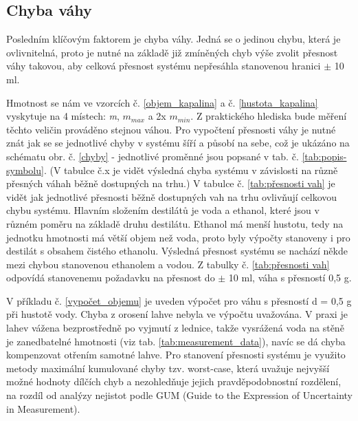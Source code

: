 

\subsection{Chyba váhy}
Posledním klíčovým faktorem je chyba váhy. Jedná se o jedinou chybu, která je ovlivnitelná, proto je nutné na základě již zmíněných chyb výše zvolit přesnost váhy takovou, aby celková přesnost systému nepřesáhla stanovenou hranici $\pm$ 10 ml.



Hmotnost se nám ve vzorcích č. \ref{objem_kapalina} a č.  \ref{hustota_kapalina} vyskytuje na 4 místech: \textit{m}, $m_{max}$ a 2x $m_{min}$. Z praktického hlediska bude měření těchto veličin prováděno stejnou váhou. Pro vypočtení přesnosti váhy je nutné znát jak se se jednotlivé chyby v systému šíří a působí na sebe, což je ukázáno na schématu obr. č. \ref{chyby} - jednotlivé proměnné jsou popsané v tab. č. \ref{tab:popis-symbolu}. (V tabulce č.x je vidět výsledná chyba systému v závislosti na různě přesných váhah běžně dostupných na trhu.) V tabulce č. \ref{tab:přesnosti vah} je vidět jak jednotlivé přesnosti běžně dostupných vah na trhu ovlivňují celkovou chybu systému. Hlavním složením destilátů je voda a ethanol, které jsou v různém poměru na základě druhu destilátu. Ethanol má menší hustotu, tedy na jednotku hmotnosti má větší objem než voda, proto byly výpočty stanoveny i pro destilát s obsahem čistého ethanolu. Výsledná přesnost systému se nachází někde mezi chybou stanovenou ethanolem a vodou. Z tabulky č. \ref{tab:přesnosti vah} odpovídá stanovenemu požadavku na přesnost do $\pm$ 10 ml, váha s přesností 0,5 g. 

V příkladu č. \ref{vypočet_objemu} je uveden výpočet pro váhu s přesností d = 0,5 g při hustotě vody. Chyba z orosení lahve nebyla ve výpočtu uvažována. V praxi je lahev vážena bezprostředně po vyjmutí z lednice, takže vysrážená voda na stěně je zanedbatelné hmotnosti (viz tab. \ref{tab:measurement_data}), navíc se dá chyba kompenzovat otřením samotné lahve. Pro stanovení přesnosti systému je využito metody maximální kumulované chyby tzv. worst-case, která uvažuje nejvyšší možné hodnoty dílčích chyb a nezohledňuje jejich pravděpodobnostní rozdělení, na rozdíl od analýzy nejistot podle GUM (Guide to the Expression of Uncertainty in Measurement).

